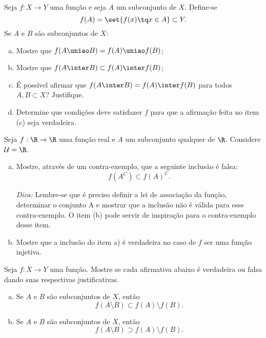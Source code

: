 \begin{exercise}
    Seja $f: X \to Y$ uma função e seja $A$ um subconjunto de $X$.
Define-se $$f(A) = \set{f(x) \tq x\in A} \subset Y.$$ Se $A$ e $B$
são subconjuntos de $X$:
\begin{enumerate}[(a)]
  \item Mostre que $f(A \uniao B) = f(A) \uniao f(B)$;
  \item Mostre que $f(A \inter B) \subset f(A) \inter f(B)$;
  \item É possível afirmar que $f(A \inter B) = f(A) \inter f(B)$ para
  todos $A, B \subset X$? Justifique.
  \item Determine que condições deve satisfazer $f$ para que a
  afirmação feita no item (c) seja verdadeira.
\end{enumerate}

\begin{exercise}\label{ex:imagemdocomplementar}
  Seja $f : \R \to \R$ uma função real e $A$ um subconjunto qualquer de $\R$. Considere $\mathcal U = \R$.
       
        \begin{enumerate}[a)]
            \item Mostre, através de um contra-exemplo, que a seguinte inclusão é falsa: $$f\left(A^C\right) \subset f(A)^C.$$
            
            \emph{Dica:} Lembre-se que é preciso definir a lei de associação da função, determinar o conjunto A e mostrar que a inclusão não é válida para esse contra-exemplo. O item (b) pode servir de inspiração para o contra-exemplo desse item.

            \item Mostre que a inclusão do item a) é verdadeira no caso de $f$ ser uma função injetiva.
        \end{enumerate}
\end{exercise}

\end{exercise}

\begin{exercise}
    Seja $f: X \to Y$ uma função. Mostre se cada afirmativa abaixo é verdadeira ou falsa dando suas respectivas justificativas.

    \begin{enumerate}[a)]
        \item Se $A$ e $B$ são subconjuntos de $X$, então $$f \left( A \setminus B \right) \subset f(A) \setminus f(B).$$
        \item  Se $A$ e $B$ são subconjuntos de $X$, então $$f \left( A \setminus B \right) \supset f(A) \setminus f(B).$$
    \end{enumerate}
\end{exercise}

